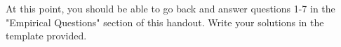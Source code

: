 \documentclass[11pt,addpoints,answers]{exam}
\begin{document}
\begin{notebox}
At this point, you should be able to go back and answer questions 1-7 in the "Empirical Questions" section of this handout.  Write your solutions in the template provided. 
\end{notebox}

\end{document}
